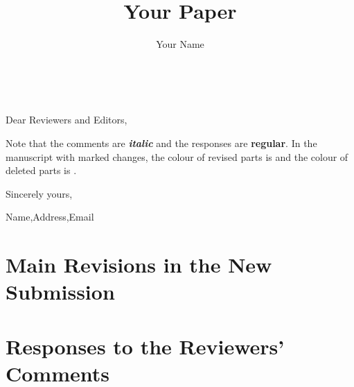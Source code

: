\documentclass{ar2rc}
\title{Your Paper}
\author{Your Name}
\begin{document}
\maketitle

~\newline

Dear Reviewers and Editors,

Note that the comments are \textit{\textbf{italic}} and the responses are \textbf{regular}. 
In the manuscript with marked changes, the colour of revised parts is  and the colour of deleted parts is .



Sincerely yours,

Name,Address,Email



\newpage


\section*{Main Revisions in the New Submission}

\lipsum[2-3]


\newpage



\section*{Responses to the Reviewers’ Comments}

\reviewersection
\label{reviewer.1}




\begin{comment} \label{pt:1.1}
    \lipsum[1-1]

\end{comment}
\end{document}
